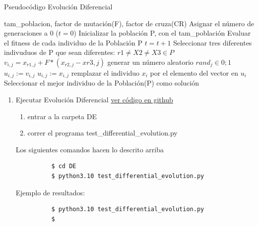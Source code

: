\documentclass{article}
\begin{document}
\begin{algorithm} \caption{Pseudocódigo Evolución Diferencial}
  \begin{algorithmic}[1]
    \Require tam\_poblacion, factor de mutación(F), factor de cruza(CR)
    \State Asignar el número de generaciones a 0 ($t=0$)
    \State Inicializar la población P, con el tam\_población
    \State Evaluar el fitness de cada individuo de la Población P
    \Repeat
    \State $t=t+1$
    \State Seleccionar tres diferentes indivuduos de P que sean diferentes: $r1\neq X2 \neq X3 \in P$
    \State $v_{i,j} = x_{r1,j} + F * (x_{r2,j}-x{r3,j})$
    \State generar un número aleatorio $rand_{j} \in \mathcal 0;1$
    \State $u_{i,j} := v_{i,j}$
    \Else
    \State $u_{i,j}:=x_{i,j}$
    \EndIf
    \EndFor
    \State remplazar el individuo $x_i$ por el elemento del vector en $u_{i}$
    \EndIf
    \EndFor
    \State Seleccionar el mejor individuo de la Población(P) como solución
  \end{algorithmic}
\end{algorithm}

\begin{enumerate}
  \item Ejecutar Evolución Diferencial
    \href{https://github.com/luisballado/InteligenciaComputacional/tree/master/code/tarea1/DE}{ver código en github}\\
    \begin{enumerate}
    \item entrar a la carpeta DE \\
    \item correr el programa test\_differential\_evolution.py\\
    \end{enumerate} 

    Los siguientes comandos hacen lo descrito arriba
    
    \begin{commandline}
        \begin{verbatim}
          $ cd DE
          $ python3.10 test_differential_evolution.py
        \end{verbatim}
    \end{commandline}

    Ejemplo de resultados:

    \begin{commandline}
        \begin{verbatim}
          $ python3.10 test_differential_evolution.py
          $
        \end{verbatim}
    \end{commandline}
\end{enumerate} 
\end{document}
